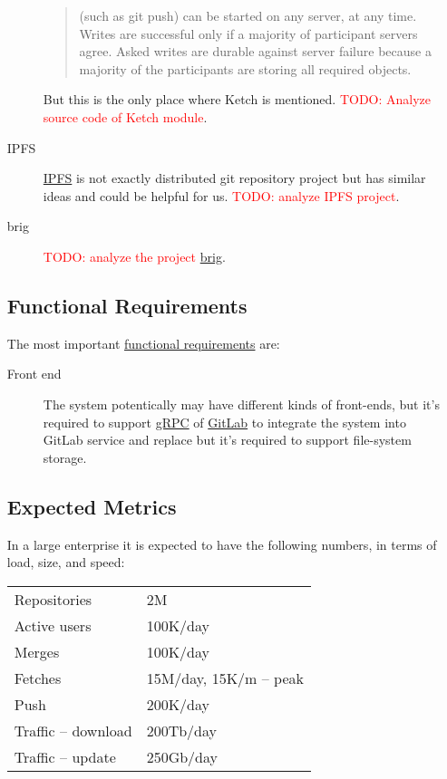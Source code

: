 \documentclass[acmlarge, screen, nonacm, 11pt]{acmart}
\newcommand{\todo}[1]{\textcolor{red}{TODO: #1}}
\begin{document}
\begin{itemize}
\begin{description}
\begin{quote}
      (such as git push) can be started on any server, at any time. Writes
      are successful only if a majority of participant servers agree.
      Asked writes are durable against server failure because a majority of
      the participants are storing all required objects.
    \end{quote}
    But this is the only place where Ketch is mentioned. \todo{Analyze source code of Ketch module}.
  \item[IPFS]
    \href{https://ipfs.io/}{IPFS} is not exactly distributed git repository project but has similar ideas
    and could be helpful for us. \todo{analyze IPFS project}.
  \item[brig]
    \todo{analyze the project} \href{https://github.com/sahib/brig}{brig}.
\end{description}

\subsection{Functional Requirements}\label{sec:fr}

The most important \href{https://en.wikipedia.org/wiki/Functional_requirement}{functional requirements} are:

\begin{description}
  \item[Front end]
    The system potentically may have different kinds of front-ends,
    but it's required to support \href{https://grpc.io/}{gRPC}
    of \href{https://about.gitlab.com/}{GitLab} to integrate the system
    into GitLab service and replace
    but it's required to support file-system storage.
\end{description}

\subsection{Expected Metrics}\label{ref:metrics}

In a large enterprise it is expected to have the following
numbers, in terms of load, size, and speed:

\begin{tabular}{ll}
  Repositories & 2M \\
  Active users & 100K/day \\
  Merges & 100K/day \\
  Fetches & 15M/day, 15K/m -- peak \\
  Push & 200K/day \\
  Traffic -- download & 200Tb/day \\
  Traffic -- update & 250Gb/day \\
\end{tabular}


\end{itemize}
\end{document}
